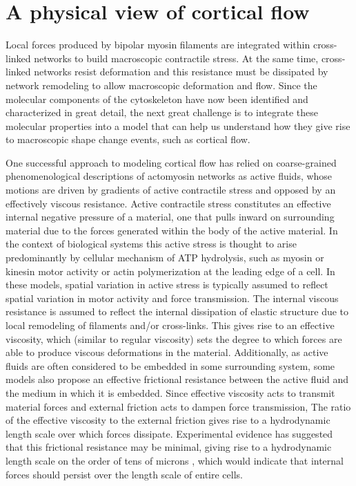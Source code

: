 \section{A physical view of cortical flow}

Local forces produced by bipolar myosin filaments are integrated within cross-linked networks to build macroscopic contractile stress\cite{Murrell:2015aa,Bendix20083126,Janson1005}.  At the same time, cross-linked networks resist deformation and this resistance must be dissipated by network remodeling to allow macroscopic deformation and flow.  Since the molecular components of the cytoskeleton have now been identified and characterized in great detail, the next great challenge is to integrate these molecular properties into a model that can help us understand how they give rise to macroscopic shape change events, such as cortical flow\cite{doi:10.1146/annurev-cellbio-100109-104027}.

One successful approach to modeling cortical flow has relied on coarse-grained phenomenological descriptions of actomyosin networks as active fluids, whose motions are driven by gradients of active contractile stress and opposed by an effectively viscous resistance\cite{cellmech_flows}.  Active contractile stress constitutes an effective internal negative pressure of a material, one that pulls inward on surrounding material due to the forces generated within the body of the active material. In the context of biological systems this active stress is thought to arise predominantly by cellular mechanism of ATP hydrolysis, such as myosin or kinesin motor activity or actin polymerization at the leading edge of a cell. In these models, spatial variation in active stress is typically assumed to reflect spatial variation in motor activity and force transmission\cite{PhysRevLett.106.028103}.  The internal viscous resistance is assumed to reflect the internal dissipation of elastic structure due to local remodeling of filaments and/or cross-links\cite{Salbreux2012536, De-La-Cruz:2015aa}. This gives rise to an effective viscosity, which (similar to regular viscosity) sets the degree to which forces are able to produce viscous deformations in the material.  Additionally, as active fluids are often considered to be embedded in some surrounding system, some models also propose an effective frictional resistance between the active fluid and the medium in which it is embedded.  Since effective viscosity acts to transmit material forces and external friction acts to dampen force transmission, The ratio of the effective viscosity to the external friction gives rise to a hydrodynamic length scale over which forces dissipate. Experimental evidence has suggested that this frictional resistance may be minimal, giving rise to a hydrodynamic length scale on the order of tens of microns \cite{cellmech_flows}, which would indicate that internal forces should persist over the length scale of entire cells. 

